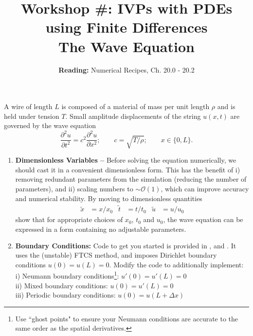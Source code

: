 \documentclass[11pt]{article}
\title{Workshop \#: IVPs with PDEs using Finite Differences \\ The Wave Equation }
\author{\textbf{Reading: } Numerical Recipes, Ch. 20.0 - 20.2 }
\date{}                                           %
\begin{document}
\maketitle

A wire of length $L$ is composed of a material of mass per unit length $\rho$ and is held under tension $T$. Small amplitude  displacements of the string $u(x,t)$ are governed by the wave equation
\begin{equation}
\frac{\partial^2 u}{\partial t^2 } = c^2 \frac{\partial^2 u}{\partial x^2 }; \quad\quad c = \sqrt{T/\rho}; \quad\quad x \in \{0,L\}.
\end{equation} 
\vspace{12pt}
\dotfill 
\begin{enumerate}

\item \textbf{Dimensionless Variables -- }  Before solving the equation numerically, we should cast it in a convenient dimensionless form. This has the benefit of i) removing redundant parameters from the simulation (reducing the number of parameters), and ii) scaling numbers to $\sim\mathcal{O}(1)$, which can improve accuracy and numerical stability. By moving to dimensionless quantities 
\begin{align}
\tilde{x} &= x/x_0 & \tilde{t} &= t/t_0 & \tilde{u} &= u/u_0
\end{align}
show that for appropriate choices of $x_0$, $t_0$ and $u_0$, the wave equation can be expressed in a form containing no adjustable parameters. 


\item \textbf{Boundary Conditions:} Code to get you started is provided in , and  . It uses the (unstable) FTCS method, and imposes  Dirichlet  boundary conditions $u(0) = u(L) = 0$. Modify the code to additionally implement:\\

 i) Neumann boundary conditions\footnote{Use ``ghost points"  to ensure your Neumann conditions are accurate to the same order as the  spatial derivatives. }: \hspace{2.9cm} $u'(0) = u'(L) = 0$ \\
 ii) Mixed boundary conditions: \hspace{3.5cm} $u(0) = u'(L) = 0 $\\
 iii) Periodic boundary conditions:  \hspace{3.2cm}$u(0) = u(L + \Delta x)$\\
 



\end{enumerate}
\end{document}
